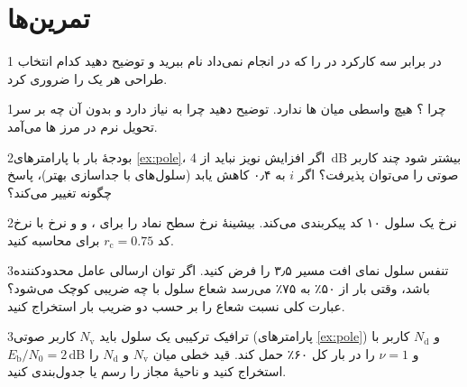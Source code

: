 \documentclass[11pt,a4paper]{article}
\begin{document}
\section{تمرین‌ها}

\begin{exercisebox}{1}{ در برابر }\label{exr:rnc}
سه کارکرد  در  را که  در  انجام نمی‌داد نام ببرید و توضیح
دهید کدام انتخاب طراحی  هر یک را ضروری کرد.
\end{exercisebox}

\begin{exercisebox}{1}{چرا ؟}\label{exr:iur}
 هیچ واسطی میان ها ندارد. توضیح دهید چرا  به  نیاز دارد و
بدون آن چه بر سر تحویل نرم در مرز ها می‌آمد.
\end{exercisebox}

\begin{exercisebox}{2}{بودجهٔ بار}\label{exr:load}
با پارامترهای \cref{ex:pole}، اگر افزایش نویز نباید از \qty{4}{\dB} بیشتر شود چند کاربر صوتی را
می‌توان پذیرفت؟ اگر $i$ به ۰٫۴ کاهش یابد (سلول‌های با جداسازی بهتر)، پاسخ چگونه تغییر می‌کند؟
\end{exercisebox}

\begin{exercisebox}{2}{نرخ }\label{exr:hsdpa}
یک سلول ۱۰ کد  پیکربندی می‌کند. بیشینهٔ نرخ سطح نماد را برای ،  و
 و نرخ با نرخ کد $r_\mathrm{c}=0.75$ برای  محاسبه کنید.
\end{exercisebox}

\begin{exercisebox}{3}{تنفس سلول}\label{exr:breath}
نمای افت مسیر ۳٫۵ را فرض کنید. اگر توان ارسالی  عامل محدودکننده باشد، وقتی بار از ۵۰٪ به
۷۵٪ می‌رسد شعاع سلول با چه ضریبی کوچک می‌شود؟ عبارت کلی نسبت شعاع را بر حسب دو ضریب بار استخراج کنید.
\end{exercisebox}

\begin{exercisebox}{3}{ترافیک ترکیبی}\label{exr:mixed}
یک سلول باید $N_\mathrm{v}$ کاربر صوتی (پارامترهای \cref{ex:pole}) و $N_\mathrm{d}$ کاربر
 با $E_\mathrm{b}/N_0 = 2$\,dB و $\nu=1$ را در بار کل ۶۰٪ حمل کند. قید خطی میان
$N_\mathrm{v}$ و $N_\mathrm{d}$ را استخراج کنید و ناحیهٔ مجاز را رسم یا جدول‌بندی کنید.
\end{exercisebox}
\end{document}
